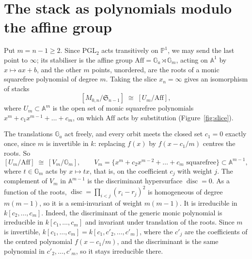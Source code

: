 \documentclass[11pt,a4paper]{amsart}
\theoremstyle{remark}
\newcommand{\M}{M_{0,n}}
\newcommand{\Sn}{\mathfrak S}
\newcommand{\Aff}{\mathrm{Aff}}
\newcommand{\Gm}{\mathbb G_m}
\newcommand{\Ga}{\mathbb G_a}
\newcommand{\PP}{\mathbb P^1}
\newcommand{\disc}{\operatorname{disc}}
\begin{document}
\section{The stack as polynomials modulo the affine group}\label{sec:stack}

Put $m = n - 1 \ge 2$. Since $\mathrm{PGL}_2$ acts transitively on $\PP$, we may send the last point to $\infty$; its stabiliser is the affine group $\Aff = \Ga \rtimes \Gm$, acting on $\mathbb A^1$ by $x \mapsto ax + b$, and the other $m$ points, unordered, are the roots of a monic squarefree polynomial of degree $m$. Taking the slice $x_n = \infty$ gives an isomorphism of stacks
\[
[\M/\Sn_{n-1}] \;\cong\; [U_m/\Aff],
\]
where $U_m \subset \mathbb A^m$ is the open set of monic squarefree polynomials $x^m + c_1x^{m-1} + \dots + c_m$, on which $\Aff$ acts by substitution (Figure~\ref{fig:slice}).

The translations $\Ga$ act freely, and every orbit meets the closed set $c_1 = 0$ exactly once, since $m$ is invertible in $k$: replacing $f(x)$ by $f(x - c_1/m)$ centres the roots. So
\[
[U_m/\Aff] \;\cong\; [V_m/\Gm], \qquad V_m = \bigl\{x^m + c_2x^{m-2} + \dots + c_m \text{ squarefree}\bigr\} \subset \mathbb A^{m-1},
\]
where $t \in \Gm$ acts by $x \mapsto tx$, that is, on the coefficient $c_j$ with weight $j$. The complement of $V_m$ in $\mathbb A^{m-1}$ is the discriminant hypersurface $\disc = 0$. As a function of the roots, $\disc = \prod_{i<j}(r_i - r_j)^2$ is homogeneous of degree $m(m-1)$, so it is a semi-invariant of weight $m(m-1)$. It is irreducible in $k[c_2, \dots, c_m]$. Indeed, the discriminant of the generic monic polynomial is irreducible in $k[c_1, \dots, c_m]$ and invariant under translation of the roots. Since $m$ is invertible, $k[c_1, \dots, c_m] = k[c_1, c'_2, \dots, c'_m]$, where the $c'_j$ are the coefficients of the centred polynomial $f(x - c_1/m)$, and the discriminant is the same polynomial in $c'_2, \dots, c'_m$, so it stays irreducible there.
\end{document}
